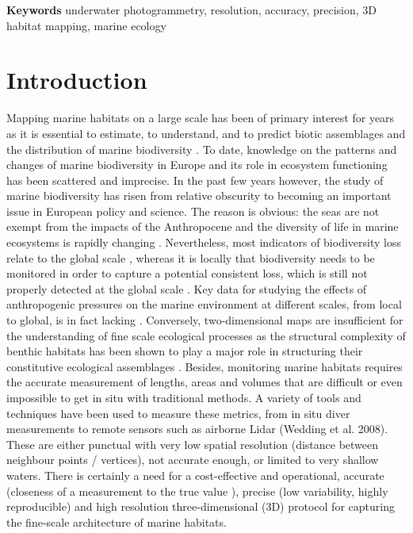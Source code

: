 \medskip
\noindent\textbf{Keywords}
underwater photogrammetry, resolution, accuracy, precision, 3D habitat mapping, marine ecology

\section[Introduction]{Introduction}\label{chapitre2_1}
Mapping marine habitats on a large scale has been of primary interest for years as it is essential to estimate, to understand, and to predict biotic assemblages and the distribution of marine biodiversity \citep{tittensor_mid-term_2014}. To date, knowledge on the patterns and changes of marine biodiversity in Europe and its role in ecosystem functioning has been scattered and imprecise. In the past few years however, the study of marine biodiversity has risen from relative obscurity to becoming an important issue in European policy and science. The reason is obvious: the seas are not exempt from the impacts of the Anthropocene and the diversity of life in marine ecosystems is rapidly changing \citep{mcgill_fifteen_2015}. Nevertheless, most indicators of biodiversity loss relate to the global scale \citep{pimm_biodiversity_2014}, whereas it is locally that biodiversity needs to be monitored in order to capture a potential consistent loss, which is still not properly detected at the global scale \citep{dornelas_assemblage_2014}. Key data for studying the effects of anthropogenic pressures on the marine environment at different scales, from local to global, is in fact lacking \citep{halpern_global_2008}. Conversely, two-dimensional maps are insufficient for the understanding of fine scale ecological processes as the structural complexity of benthic habitats has been shown to play a major role in structuring their constitutive ecological assemblages \citep{agudo-adriani_colony_2016, darling_relationships_2017, friedlander_designing_2003, graham_importance_2013, kovalenko_habitat_2012}. Besides, monitoring marine habitats requires the accurate measurement of lengths, areas and volumes that are difficult or even impossible to get in situ with traditional methods. A variety of tools and techniques have been used to measure these metrics, from in situ diver measurements \citep{dustan_digital_2013} to remote sensors such as airborne Lidar (Wedding et al. 2008). These are either punctual with very low spatial resolution (distance between neighbour points / vertices), not accurate enough, or limited to very shallow waters. There is certainly a need for a cost-effective and operational, accurate (closeness of a measurement to the true value \citep{granshaw_photogrammetric_2016}), precise (low variability, highly reproducible) and high resolution three-dimensional (3D) protocol for capturing the fine-scale architecture of marine habitats.


